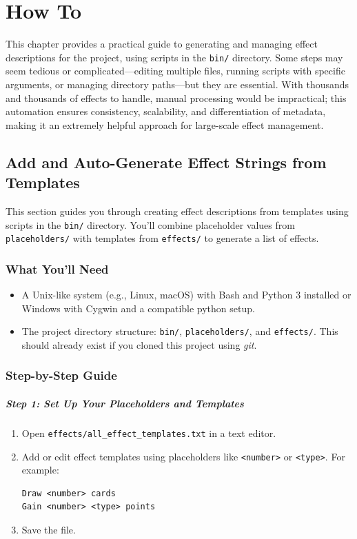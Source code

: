 \chapter{How To}

This chapter provides a practical guide to generating and managing effect descriptions for the project, using scripts in the \texttt{bin/} directory. Some steps may seem tedious or complicated—editing multiple files, running scripts with specific arguments, or managing directory paths—but they are essential. With thousands and thousands of effects to handle, manual processing would be impractical; this automation ensures consistency, scalability, and differentiation of metadata, making it an extremely helpful approach for large-scale effect management.



\section{Add and Auto-Generate Effect Strings from Templates}

This section guides you through creating effect descriptions from templates using scripts in the \texttt{bin/} directory. You’ll combine placeholder values from \texttt{placeholders/} with templates from \texttt{effects/} to generate a list of effects.

\subsection{What You’ll Need}
\begin{itemize}
	\item A Unix-like system (e.g., Linux, macOS) with Bash and Python 3 installed or Windows with Cygwin and a compatible python setup.
	\item The project directory structure: \texttt{bin/}, \texttt{placeholders/}, and \texttt{effects/}. This should already exist if you cloned this project using \textit{git}.
\end{itemize}

\subsection{Step-by-Step Guide}

\paragraph{Step 1: Set Up Your Placeholders and Templates}
\begin{enumerate}
	\item Open \texttt{effects/all\_effect\_templates.txt} in a text editor.
	\item Add or edit effect templates using placeholders like \texttt{<number>} or \texttt{<type>}. For example:
\begin{lstlisting}
Draw <number> cards
Gain <number> <type> points
\end{lstlisting}
	\item Save the file.
\end{enumerate}

